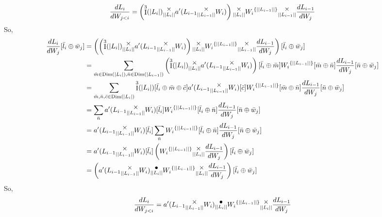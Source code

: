 \documentclass[12pt]{book}
\theoremstyle{plain}
\theoremstyle{definition}
\theoremstyle{ppart}
\theoremstyle{case}
\theoremstyle{solution}
\DeclareMathOperator{\Dim}{Dim}
\DeclareMathOperator{\Ident}{I}
\newcommand{\mmult}[1]{\text{\raisebox{1ex}{$\underset{#1}{\times}$}}}
\newcommand{\dmult}[1]{\text{\raisebox{1ex}{$\underset{#1}{\,\bullet\,}$}}}
\newcommand{\shape}[1]{\left|#1\right|}
\newcommand{\transpose}[2]{{#1}^{\{#2\}}}
\begin{document}
\begin{appendices}
\begin{landscape}
\[
  \frac{dL_i}{dW_{j<i}} =
      \left(\Ident^3(\shape{L_i}) \mmult{\shape{\shape{L_i}}} a'(L_{i-1} \mmult{\shape{\shape{L_{i-1}}}} W_i) \right) 
      \mmult{\shape{\shape{L_i}}}
      \transpose{W_i}{\shape{\shape{L_{i-1}}}}
      \mmult{\shape{\shape{L_{i-1}}}}
      \frac{d L_{i-1}}{dW_j}
\]
So,
\begin{align*}
  \frac{dL_i}{dW_j}[\bar{l}_i \oplus \bar{w}_j]
  &= 
  \left(
    \left(\Ident^3(\shape{L_i}) \mmult{\shape{\shape{L_i}}} a'(L_{i-1} \mmult{\shape{\shape{L_{i-1}}}} W_i) \right) 
    \mmult{\shape{\shape{L_i}}}
    \transpose{W_i}{\shape{\shape{L_{i-1}}}}
    \mmult{\shape{\shape{L_{i-1}}}}
    \frac{d L_{i-1}}{dW_j}
  \right)[\bar{l}_i \oplus \bar{w}_j] \\
  &= 
  \sum_{\bar{m} \in \Dim(\shape{L_i}), \bar{n} \in \Dim(\shape{L_{i-1}})}
    \left(\Ident^3(\shape{L_i}) \mmult{\shape{\shape{L_i}}} a'(L_{i-1} \mmult{\shape{\shape{L_{i-1}}}} W_i) \right)[\bar{l}_i \oplus \bar{m}]
    \transpose{W_i}{\shape{\shape{L_{i-1}}}} [\bar{m} \oplus \bar{n}]
    \frac{d L_{i-1}}{dW_j} [\bar{n} \oplus \bar{w}_j] \\
  &=
  \sum_{\bar{m}, \bar{n},\bar{c} \in \Dim(\shape{L_i})}
    \Ident^3(\shape{L_i})[\bar{l}_i \oplus \bar{m} \oplus \bar{c}]
    a'(L_{i-1} \mmult{\shape{\shape{L_{i-1}}}} W_i)[\bar{c}]
    \transpose{W_i}{\shape{\shape{L_{i-1}}}} [\bar{m} \oplus \bar{n}]
    \frac{d L_{i-1}}{dW_j} [\bar{n} \oplus \bar{w}_j] \\
  &=
  \sum_{\bar{n}}
    a'(L_{i-1} \mmult{\shape{\shape{L_{i-1}}}} W_i)[\bar{l}_i]
    \transpose{W_i}{\shape{\shape{L_{i-1}}}} [\bar{l}_i \oplus \bar{n}]
    \frac{d L_{i-1}}{dW_j} [\bar{n} \oplus \bar{w}_j] \\
  &=
  a'(L_{i-1} \mmult{\shape{\shape{L_{i-1}}}} W_i)[\bar{l}_i]
  \sum_{\bar{n}}
    \transpose{W_i}{\shape{\shape{L_{i-1}}}} [\bar{l}_i \oplus \bar{n}]
    \frac{d L_{i-1}}{dW_j} [\bar{n} \oplus \bar{w}_j] \\
  &=
  a'(L_{i-1} \mmult{\shape{\shape{L_{i-1}}}} W_i)[\bar{l}_i]
  \left(
    \transpose{W_i}{\shape{\shape{L_{i-1}}}} 
    \mmult{\shape{\shape{L_i}}}
    \frac{d L_{i-1}}{dW_j}
  \right) [\bar{l}_i \oplus \bar{w}_j] \\
  &=
  \left(
    a'(L_{i-1} \mmult{\shape{\shape{L_{i-1}}}} W_i)
    \dmult{\shape{\shape{L_i}}}
    \transpose{W_i}{\shape{\shape{L_{i-1}}}} 
    \mmult{\shape{\shape{L_i}}}
    \frac{d L_{i-1}}{dW_j}
  \right) [\bar{l}_i \oplus \bar{w}_j]
\end{align*}
So,
\[ 
  \frac{dL_i}{dW_{j<i}}
  = 
  a'(L_{i-1} \mmult{\shape{\shape{L_{i-1}}}} W_i)
  \dmult{\shape{\shape{L_i}}}
  \transpose{W_i}{\shape{\shape{L_{i-1}}}} 
  \mmult{\shape{\shape{L_i}}}
  \frac{d L_{i-1}}{dW_j}
\]



\end{landscape}
\end{appendices}
\end{document}
